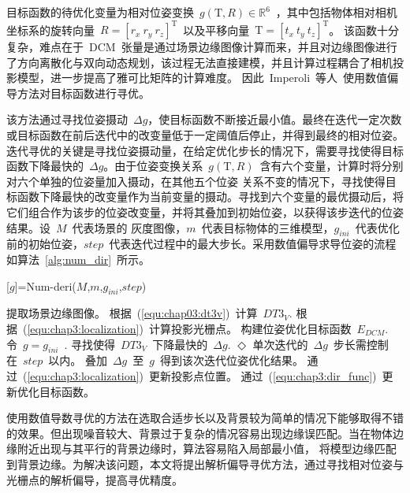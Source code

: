 目标函数的待优化变量为相对位姿变换~$g(\textrm{T},R)\in \mathbb{R}^6$~，其中包括物体相对相机坐标系的旋转向量~$R=[r_x~r_y~r_z]^\textrm{T}$~以及平移向量~$\textrm{T}=[t_x~t_y~t_z]^\textrm{T}$。
该函数十分复杂，难点在于~DCM~张量是通过场景边缘图像计算而来，并且对边缘图像进行了方向离散化与双向动态规划，该过程无法直接建模，并且计算过程耦合了相机投影模型，进一步提高了雅可比矩阵的计算难度。
因此~Imperoli~等人~\cite{ImperoliD2COFastRobust2015}使用数值偏导方法对目标函数进行寻优。

该方法通过寻找位姿摄动~$\Delta g$，使目标函数不断接近最小值。最终在迭代一定次数或目标函数在前后迭代中的改变量低于一定阈值后停止，并得到最终的相对位姿。
迭代寻优的关键是寻找位姿摄动量，在给定优化步长的情况下，需要寻找使得目标函数下降最快的~$\Delta g$。由于位姿变换关系~$g(\textrm{T},R)$~含有六个变量，计算时将分别对六个单独的位姿量加入摄动，在其他五个位姿
关系不变的情况下，寻找使得目标函数下降最快的改变量作为当前变量的摄动。寻找到六个变量的最优摄动后，将它们组合作为该步的位姿改变量，并将其叠加到初始位姿，以获得该步迭代的位姿结果。设~$M$~代表场景的
灰度图像，$m$~代表目标物体的三维模型，$g_{ini}$~代表优化前的初始位姿，$step$~代表迭代过程中的最大步长。采用数值偏导求导位姿的流程如算法~\ref{alg:num_dir}~所示。
\begin{algorithm}[H]
  \caption{[$g$]=Num-deri($M$,$m$,$g_{ini}$,$step$)}
  \label{alg:num_dir}
  \begin{algorithmic}[1]
    \State 提取场景边缘图像。
    \State 根据~(\ref{equ:chap03:dt3v})~计算~$DT3_V$.
    \State 根据~(\ref{equ:chap3:localization})~计算投影光栅点。
    \State 构建位姿优化目标函数~$E_{DCM}$.
    \State 令~$g=g_{ini}$~.
    \Repeat
    \State 寻找使得~$DT3_V$~下降最快的~$\Delta g$.
    \Statex \hspace{0.2cm} $\Diamond$ 单次迭代的~$\Delta g$~步长需控制在~$step$~以内。
    \State 叠加~$\Delta g$~至~$g$~得到该次迭代位姿优化结果。
    \State 通过~(\ref{equ:chap3:localization})~更新投影点位置。
    \State 通过~(\ref{equ:chap3:dir_func})~更新优化目标函数。
    \\
  \end{algorithmic}
\end{algorithm}

使用数值导数寻优的方法在选取合适步长以及背景较为简单的情况下能够取得不错的效果。但出现噪音较大、背景过于复杂的情况容易出现边缘误匹配。当在物体边缘附近出现与其平行的背景边缘时，算法容易陷入局部最小值，
将模型边缘匹配到背景边缘。为解决该问题，本文将提出解析偏导寻优方法，通过寻找相对位姿与光栅点的解析偏导，提高寻优精度。

